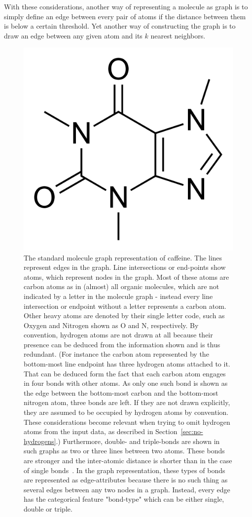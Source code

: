 With these considerations, another way of representing a molecule as graph is to simply define an edge between every pair of atoms if the distance between them is below a certain threshold. Yet another way of constructing the graph is to draw an edge between any given atom and its $k$ nearest neighbors.


\begin{figure}[H]
	\centering
	\includegraphics[width=0.6\linewidth]{figures/caffeine}
	\caption{The standard molecule graph representation of caffeine. The lines represent edges in the graph. Line intersections or end-points show atoms, which represent nodes in the graph. Most of these atoms are carbon atoms as in (almost) all organic molecules, which are not indicated by a letter in the molecule graph - instead every line intersection or endpoint without a letter represents a carbon atom. Other heavy atoms are denoted by their single letter code, such as Oxygen and Nitrogen shown as O and N, respectively.
	By convention, hydrogen atoms are not drawn at all because their presence can be deduced from the information shown and is thus redundant. (For instance the carbon atom represented by the bottom-most line endpoint has three hydrogen atoms attached to it. That can be deduced form the fact that each carbon atom engages in four bonds with other atoms. As only one such bond is shown as the edge between the bottom-most carbon and the bottom-most nitrogen atom, three bonds are left. If they are not drawn explicitly, they are assumed to be occupied by hydrogen atoms by convention. These considerations become relevant when trying to omit hydrogen atoms from the input data, as described in Section~\ref{sec:no-hydrogens}.)
	Furthermore, double- and triple-bonds are shown in such graphs as two or three lines between two atoms. These bonds are stronger and the inter-atomic distance is shorter than in the case of single bonds~\cite{Organic-chemistry}. In the graph representation, these types of bonds are represented as edge-attributes because there is no such thing as several edges between any two nodes in a graph. Instead, every edge has the categorical feature "bond-type" which can be either single, double or triple.
	}
	\label{fig:caffeine}
\end{figure}


